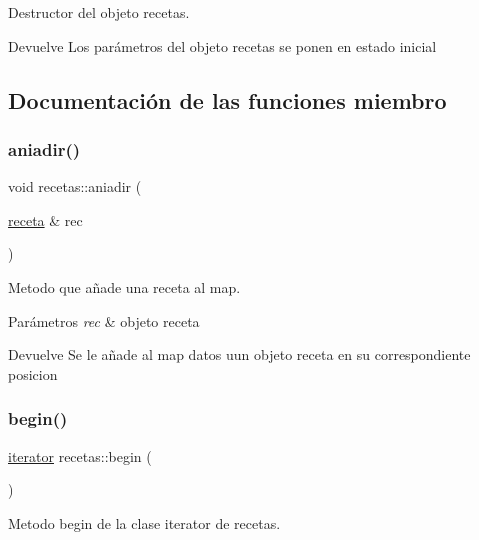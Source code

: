 Destructor del objeto recetas. 

\begin{DoxyReturn}{Devuelve}
Los parámetros del objeto recetas se ponen en estado inicial 
\end{DoxyReturn}


\subsection{Documentación de las funciones miembro}
\mbox{\label{classrecetas_af55a0d5e9394710cf6390fa67f38b49a}} 
\subsubsection{\texorpdfstring{aniadir()}{aniadir()}}
{\footnotesize\ttfamily void recetas\+::aniadir (\begin{DoxyParamCaption}\item[{\hyperlink{classreceta}{receta} \&}]{rec }\end{DoxyParamCaption})}



Metodo que añade una receta al map. 


\begin{DoxyParams}{Parámetros}
{\em rec} & objeto receta \\
\hline
\end{DoxyParams}
\begin{DoxyReturn}{Devuelve}
Se le añade al map datos uun objeto receta en su correspondiente posicion 
\end{DoxyReturn}
\mbox{\label{classrecetas_a7b51f0b8e1d4a5d604cd0d8dd35356a1}} 
\subsubsection{\texorpdfstring{begin()}{begin()}}
{\footnotesize\ttfamily \hyperlink{classrecetas_1_1iterator}{iterator} recetas\+::begin (\begin{DoxyParamCaption}{ }\end{DoxyParamCaption})\hspace{0.3cm}{\ttfamily [inline]}}



Metodo begin de la clase iterator de recetas. 

